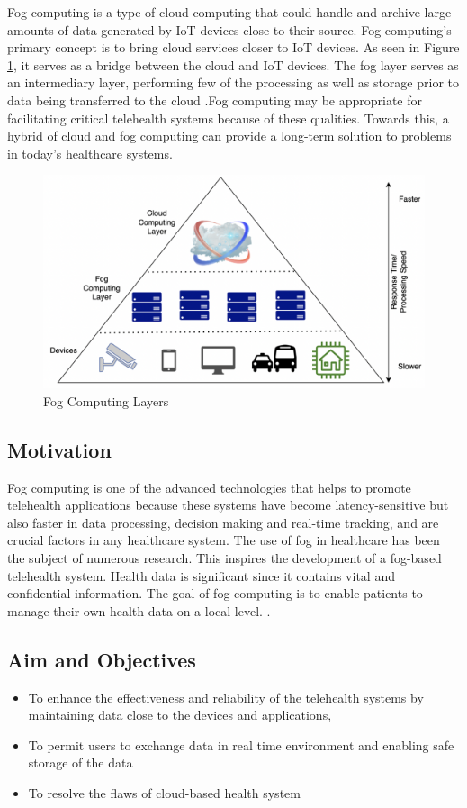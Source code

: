 \documentclass[10pt]{article}
\begin{document}
Fog computing is a type of cloud computing that could handle and archive large amounts of data generated by IoT devices close to their source. Fog computing's primary concept is to bring cloud services closer to IoT devices. As seen in Figure \ref{fig:1}, it serves as a bridge between the cloud and IoT devices. The fog layer serves as an intermediary layer, performing few of the processing as well as storage prior to data being transferred to the cloud \cite{2}.Fog computing may be appropriate for facilitating critical telehealth systems because of these qualities. Towards this, a hybrid of cloud and fog computing can provide a long-term solution to problems in today's healthcare systems.
\newline

\begin{figure}[H]
    \begin{center}
        \includegraphics[width=0.7\linewidth,frame]{CA2-template/RIC1.png}
        \caption{Fog Computing Layers\label{fig:1}}
    \end{center}
\end{figure}


\subsection{Motivation}

Fog computing is one of the advanced technologies that helps to promote telehealth applications because these systems have become latency-sensitive but also faster in data processing, decision making and real-time tracking,  and are crucial factors in any healthcare system. The use of fog in healthcare has been the subject of numerous research. This inspires the development of a fog-based telehealth system. Health data is significant since it contains vital and confidential information. The goal of fog computing is to enable patients to manage their own health data on a local level.
\cite{4}. 

\subsection{Aim and Objectives}
\begin{itemize}
    \item To enhance the effectiveness and reliability of the telehealth systems by maintaining data close to the devices and applications,
\item To permit users to exchange data in real time environment and enabling safe storage of the data
\item To resolve the flaws of cloud-based health system
\end{itemize}
\end{document}
